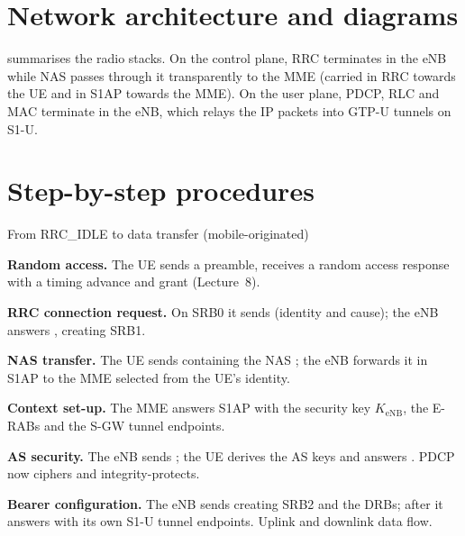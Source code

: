 \documentclass[11pt,a4paper]{article}
\begin{document}
\begin{acnfigure}
  \caption{Average power (left axis) and mean added latency (right axis) versus DRX cycle for
  $T_{\mathrm{on}} = 10$\,ms, from \cref{eq:drx}.}
  \label{fig:drx}
\end{acnfigure}

\section{Network architecture and diagrams}
 summarises the radio stacks. On the control plane, RRC terminates in the eNB
while NAS passes through it transparently to the MME (carried in RRC towards the UE and in S1AP
towards the MME). On the user plane, PDCP, RLC and MAC terminate in the eNB, which relays the IP
packets into GTP-U tunnels on S1-U.

\begin{acnfigure}
  \caption{LTE radio protocol stacks: control plane (left) and user plane (right).}
  \label{fig:stacks}
\end{acnfigure}

\section{Step-by-step procedures}
\begin{procedurebox}{From RRC\_IDLE to data transfer (mobile-originated)}\label{proc:idle2conn}
\begin{steps}
  \item \textbf{Random access.} The UE sends a preamble, receives a random access response with a
        timing advance and grant (Lecture~8).
  \item \textbf{RRC connection request.} On SRB0 it sends  (identity and
        cause); the eNB answers , creating SRB1.
  \item \textbf{NAS transfer.} The UE sends  containing the NAS
        ; the eNB forwards it in S1AP  to the MME
        selected from the UE's identity.
  \item \textbf{Context set-up.} The MME answers S1AP  with the
        security key $K_{\mathrm{eNB}}$, the E-RABs and the S-GW tunnel endpoints.
  \item \textbf{AS security.} The eNB sends ; the UE derives the AS keys
        and answers . PDCP now ciphers and integrity-protects.
  \item \textbf{Bearer configuration.} The eNB sends  creating SRB2
        and the DRBs; after  it answers 
        with its own S1-U tunnel endpoints. Uplink and downlink data flow.
\end{steps}
\end{procedurebox}
\end{document}
